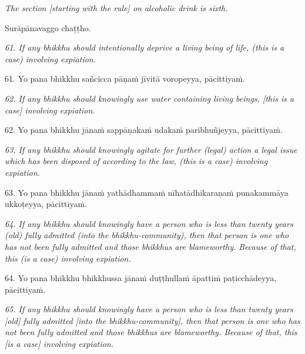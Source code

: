 \documentclass[11pt]{article}
\begin{document}
\begin{paracol}{2}
\begin{column}
{\itshape\footnotesize
The section [starting with the rule] on alcoholic drink is sixth.
}
\switchcolumn

\begin{flushleft}
Surāpānavaggo chaṭṭho.
\switchcolumn*
\end{flushleft}

{\itshape\footnotesize
61. If any bhikkhu should intentionally deprive a living being of life, (this is a case) involving expiation.
}
\switchcolumn

\begin{flushleft}
61. Yo pana bhikkhu sañcicca pāṇaṁ jīvitā voropeyya, pācittiyaṁ.
\switchcolumn*
\end{flushleft}

{\itshape\footnotesize
62. If any bhikkhu should knowingly use water containing living beings, [this is a case] involving expiation.
}
\switchcolumn

\begin{flushleft}
62. Yo pana bhikkhu jānaṁ sappāṇakaṁ udakaṁ paribhuñjeyya,
pācittiyaṁ.
\switchcolumn*
\end{flushleft}

{\itshape\footnotesize
63. If any bhikkhu should knowingly agitate for further (legal) action a legal issue which has been disposed of according to the law, (this is a case) involving expiation.
}
\switchcolumn

\begin{flushleft}
63. Yo pana bhikkhu jānaṁ yathādhammaṁ nīhatādhikaraṇaṁ punakammāya ukkoṭeyya, pācittiyaṁ.
\switchcolumn*
\end{flushleft}

{\itshape\footnotesize
64. If any bhikkhu should knowingly have a person who is less than twenty years (old) fully admitted (into the bhikkhu-community), then that person is one who has not been fully admitted and those bhikkhus are blameworthy. Because of that, this (is a case) involving expiation.
}
\switchcolumn

\begin{flushleft}
64. Yo pana bhikkhu bhikkhussa jānaṁ duṭṭhullaṁ āpattiṁ paṭicchādeyya, pācittiyaṁ.
\switchcolumn*
\end{flushleft}

{\itshape\footnotesize
65. If any bhikkhu should knowingly have a person who is less than twenty years [old] fully admitted [into 
the bhikkhu-community], then that person is one who has not been fully admitted and those bhikkhus are 
blameworthy. Because of that, this [is a case] involving expiation.
}
\switchcolumn


\end{column}
\end{paracol}
\end{document}
